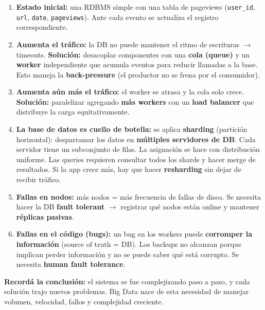 \documentclass[11pt, a4paper]{article}
\begin{document}
\begin{enumerate}
	\item \textbf{Estado inicial:} una RDBMS simple con una tabla de pageviews (\texttt{user\_id}, \texttt{url}, \texttt{date}, \texttt{pageviews}). Ante cada evento se actualiza el registro correspondiente.

	\item \textbf{Aumenta el tráfico:} la DB no puede mantener el ritmo de escrituras $\to$ timeouts. \textbf{Solución:} desacoplar componentes con una \textbf{cola (queue)} y un \textbf{worker} independiente que acumula eventos para reducir llamadas a la base. Esto maneja la \textbf{back-pressure} (el productor no se frena por el consumidor).

	\item \textbf{Aumenta aún más el tráfico:} el worker se atrasa y la cola solo crece. \textbf{Solución:} paralelizar agregando \textbf{más workers} con un \textbf{load balancer} que distribuye la carga equitativamente.

	\item \textbf{La base de datos es cuello de botella:} se aplica \textbf{sharding} (partición horizontal): desparramar los datos en \textbf{múltiples servidores de DB}. Cada servidor tiene un subconjunto de filas. La asignación se hace con distribución uniforme. Las queries requieren consultar todos los shards y hacer merge de resultados. Si la app crece más, hay que hacer \textbf{resharding} sin dejar de recibir tráfico.

	\item \textbf{Fallas en nodos:} más nodos = más frecuencia de fallas de disco. Se necesita hacer la DB \textbf{fault tolerant} $\to$ registrar qué nodos están online y mantener \textbf{réplicas pasivas}.

	\item \textbf{Fallas en el código (bugs):} un bug en los workers puede \textbf{corromper la información} (source of truth = DB). Los backups no alcanzan porque implican perder información y no se puede saber qué está corrupto. Se necesita \textbf{human fault tolerance}.
\end{enumerate}

\begin{recallbox}
	\textbf{Recordá la conclusión:} el sistema se fue complejizando paso a paso, y cada solución trajo nuevos problemas. Big Data nace de esta necesidad de manejar volumen, velocidad, fallos y complejidad creciente.
\end{recallbox}
\end{document}
